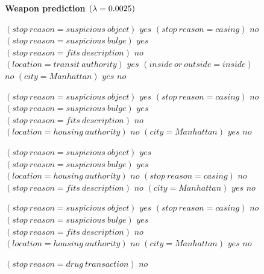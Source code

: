 \begin{figure}[h!]
\textbf{Weapon prediction $({\lambda} = 0.0025)$}
\vspace{0.5mm}
\scriptsize
\begin{algorithmic}
\State \bif $(stop~reason = suspicious~object)$ \bthen $yes$ 
\State \belif $(stop~reason = casing)$ \bthen $no$
\State \belif $(stop~reason = suspicious~bulge)$ \bthen $yes$
\State \belif $(stop~reason = fits~description)$ \bthen $no$
\State \belif $(location = transit~authority)$ \bthen $yes$
\State \belif $(inside~or~outside = inside)$ \bthen $no$
\State \belif $(city = Manhattan)$ \bthen $yes$
\State \belse $no$
\end{algorithmic}
\vspace{0.5mm}
\begin{algorithmic}
\State \bif $(stop~reason = suspicious~object)$ \bthen $yes$ 
\State \belif $(stop~reason = casing)$ \bthen $no$
\State \belif $(stop~reason = suspicious~bulge)$ \bthen $yes$
\State \belif $(stop~reason = fits~description)$ \bthen $no$
\State \belif $(location = housing~authority)$ \bthen $no$
\State \belif $(city = Manhattan)$ \bthen $yes$
\State \belse $no$
\end{algorithmic}
\vspace{0.5mm}
\begin{algorithmic}
\State \bif $(stop~reason = suspicious~object)$ \bthen $yes$ 
\State \belif $(stop~reason = suspicious~bulge)$ \bthen $yes$
\State \belif $(location = housing~authority)$ \bthen $no$
\State \belif $(stop~reason = casing)$ \bthen $no$
\State \belif $(stop~reason = fits~description)$ \bthen $no$
\State \belif $(city = Manhattan)$ \bthen $yes$
\State \belse $no$
\end{algorithmic}
\vspace{0.5mm}
\begin{algorithmic}
\State \bif $(stop~reason = suspicious~object)$ \bthen $yes$ 
\State \belif $(stop~reason = casing)$ \bthen $no$
\State \belif $(stop~reason = suspicious~bulge)$ \bthen $yes$
\State \belif $(stop~reason = fits~description)$ \bthen $no$
\State \belif $(location = housing~authority)$ \bthen $no$
\State \belif $(city = Manhattan)$ \bthen $yes$
\State \belse $no$
\end{algorithmic}
\vspace{0.5mm}
\begin{algorithmic}
\State \bif $(stop~reason = drug~transaction)$ \bthen $no$ 

\end{algorithmic}
\end{figure}
